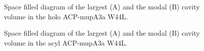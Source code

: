 \begin{singlespacing}
		\setlength\fboxsep{5pt}
		\setlength\fboxrule{1.5pt}
		\begin{figure}[htbp]
		\centering
		\caption[Space filled diagram of the largest and the modal cavity volume in the holo ACP-mupA3a W44L.]{Space filled diagram of the largest (A) and the modal (B) cavity volume in the holo ACP-mupA3a W44L.}
		\label{fig:ppt_mutant}
		\end{figure}

		\setlength\fboxsep{5pt}
		\setlength\fboxrule{1.5pt}
		\begin{figure}[htbp]
		\centering
		\caption[Space filled diagram of the largest and the modal cavity volume in the acyl ACP-mupA3a W44L.]{Space filled diagram of the largest (A) and the modal (B) cavity volume in the acyl ACP-mupA3a W44L.}
		\label{fig:spm_mutant}
		\end{figure}


\end{singlespacing}
